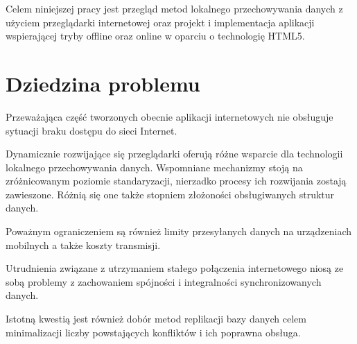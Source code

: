 Celem niniejszej pracy jest przegląd metod lokalnego przechowywania danych z użyciem przeglądarki internetowej oraz projekt i implementacja aplikacji wspierającej tryby offline oraz online w oparciu o technologię HTML5.

\section{Dziedzina problemu}
\label{sec:dziedzinaProblemu}

Przeważająca część tworzonych obecnie aplikacji internetowych nie obsługuje sytuacji braku dostępu do sieci Internet. 

Dynamicznie rozwijające się przeglądarki oferują różne wsparcie dla technologii lokalnego przechowywania danych. Wspomniane mechanizmy stoją na zróżnicowanym poziomie standaryzacji, nierzadko procesy ich rozwijania zostają zawieszone. Różnią się one także stopniem złożoności obsługiwanych struktur danych.

Poważnym ograniczeniem są również limity przesyłanych danych na urządzeniach mobilnych a także koszty transmisji.

Utrudnienia związane z utrzymaniem stałego połączenia internetowego niosą ze sobą problemy z zachowaniem spójności i integralności synchronizowanych danych.

Istotną kwestią jest również dobór metod replikacji bazy danych celem minimalizacji liczby powstających konfliktów i ich poprawna obsługa.
